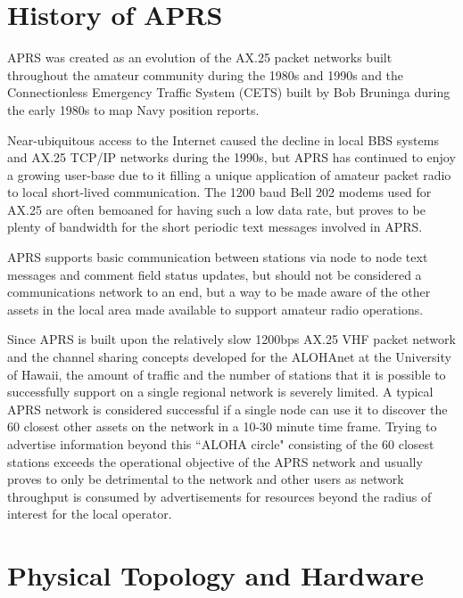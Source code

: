 \section{History of APRS}

APRS was created as an evolution of the AX.25 packet networks
built throughout the amateur community during the 1980s and 1990s and 
the Connectionless Emergency Traffic System (CETS) built by 
Bob Bruninga during the early 1980s to map Navy position reports.

Near-ubiquitous access to the Internet caused the decline in local BBS 
systems and AX.25 TCP/IP networks during the 1990s, but APRS has 
continued to enjoy a growing user-base due to it filling a unique 
application of amateur packet radio to local short-lived communication.
The 1200 baud Bell 202 modems used for AX.25 are often bemoaned for having
such a low data rate, but proves to be plenty of bandwidth for the short periodic
text messages involved in APRS.

APRS supports basic communication between stations via node to node 
text messages and comment field status updates, but should not be 
considered a communications network to an end, but a way to be made aware
of the other assets in the local area made available to support amateur 
radio operations.

Since APRS is built upon the relatively slow 
1200bps AX.25 VHF packet
network and the channel sharing concepts developed for the ALOHAnet at
the University of Hawaii, the amount of 
traffic and the number of stations that it is possible to successfully 
support on a single regional network is severely limited. 
A typical APRS network is considered successful if a single node
can use it to discover the 60 closest other assets on the network in a
10-30 minute time frame. Trying to advertise information beyond this
``ALOHA circle" consisting of the 60 closest stations exceeds the 
operational objective of the APRS network and usually proves to only be 
detrimental to the network and other users as network throughput is 
consumed by advertisements for 
resources beyond the radius of interest for the local operator.

\section{Physical Topology and Hardware}

